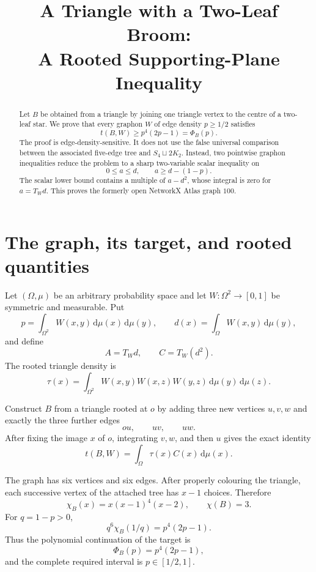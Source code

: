 \documentclass[11pt]{article}
\title{A Triangle with a Two-Leaf Broom:\\
A Rooted Supporting-Plane Inequality}
\author{}
\date{}
\newcommand{\dd}{\,\mathrm d}
\begin{document}
\maketitle

\begin{abstract}
Let $B$ be obtained from a triangle by joining one triangle vertex to the
centre of a two-leaf star.  We prove that every graphon $W$ of edge density
$p\geq1/2$ satisfies
\[
 t(B,W)\geq p^4(2p-1)=\Phi_B(p).
\]
The proof is edge-density-sensitive.  It does not use the false universal
comparison between the associated five-edge tree and
$S_4\sqcup2K_2$.  Instead, two pointwise graphon inequalities reduce the
problem to a sharp two-variable scalar inequality on
\[
 0\leq a\leq d,\qquad a\geq d-(1-p).
\]
The scalar lower bound contains a multiple of $a-d^2$, whose integral is
zero for $a=T_Wd$.  This proves the formerly open NetworkX Atlas graph
$100$.
\end{abstract}


\section{The graph, its target, and rooted quantities}

Let $(\Omega,\mu)$ be an arbitrary probability space and let
$W\colon\Omega^2\to[0,1]$ be symmetric and measurable.  Put
\[
 p=\int_{\Omega^2}W(x,y)\dd\mu(x)\dd\mu(y),
 \qquad
 d(x)=\int_\Omega W(x,y)\dd\mu(y),
\]
and define
\[
 A=T_Wd,
 \qquad
 C=T_W(d^2).
\]
The rooted triangle density is
\[
 \tau(x)=\int_{\Omega^2}
 W(x,y)W(x,z)W(y,z)\dd\mu(y)\dd\mu(z).
\]

Construct $B$ from a triangle rooted at $o$ by adding three new vertices
$u,v,w$ and exactly the three further edges
\[
 ou,\qquad uv,\qquad uw.
\]
After fixing the image $x$ of $o$, integrating $v,w$, and then $u$ gives
the exact identity
\begin{equation}
 t(B,W)=\int_\Omega \tau(x)C(x)\dd\mu(x).
 \label{eq:density}
\end{equation}

The graph has six vertices and six edges.  After properly colouring the
triangle, each successive vertex of the attached tree has $x-1$ choices.
Therefore
\[
 \chi_B(x)=x(x-1)^4(x-2),
 \qquad \chi(B)=3.
\]
For $q=1-p>0$,
\[
 q^6\chi_B(1/q)=p^4(2p-1).
\]
Thus the polynomial continuation of the target is
\begin{equation}
 \Phi_B(p)=p^4(2p-1),
 \label{eq:target}
\end{equation}
and the complete required interval is $p\in[1/2,1]$.
\end{document}
